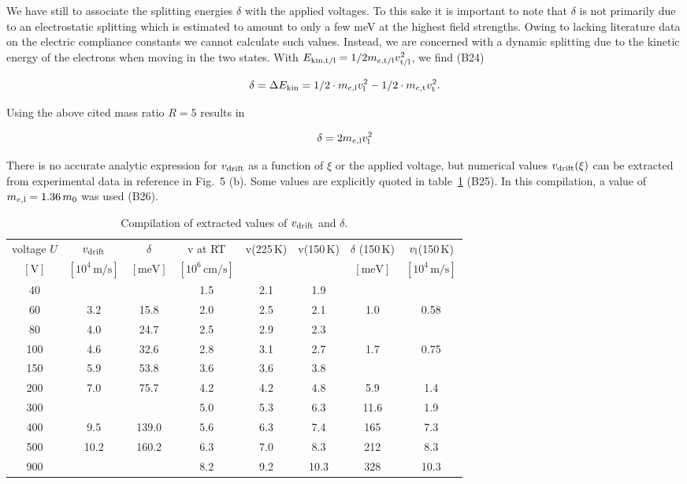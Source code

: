 We have still to associate the splitting energies $\delta$ with the applied voltages. 
To this sake it is important to note that $\delta$ is not primarily due to an electrostatic splitting which is estimated to amount to only a few meV at the highest field strengths. 
Owing to lacking literature data on the electric compliance constants we cannot calculate such values. 
Instead, we are concerned with a dynamic splitting due to the kinetic energy of the electrons when moving in the two states. 
With $E_{\textrm{kin,t/l}} = 1/2 m_{\mathnormal{e},\textrm{t/l}}v_{\textrm{t/l}}^2$, we find {\color{red}(B24)}

\begin{equation}
 \delta = \Delta E_{\textrm{kin}} = 1/2 \cdot m_{\mathnormal{e},\textrm{l}} v_{\textrm{l}}^2 - 1/2 \cdot m_{\mathnormal{e},\textrm{t}} v_{\textrm{t}}^2.
\end{equation}

\noindent
Using the above cited mass ratio $R =5$ results in

\begin{equation}
 \delta = 2 m_{\mathnormal{e},\textrm{l}} v_{\textrm{l}}^2
\end{equation}

\noindent
There is no accurate analytic expression for $v_{\textrm{drift}}$ as a function of $\xi$ or the applied voltage,
 but numerical values $v_{\textrm{drift}}(\xi)$ can be extracted from experimental data in reference \cite{jansen:173706} in Fig.~5 (b). 
Some values are explicitly quoted in table~\ref{tab:deltas} {\color{red}(B25)}.
In this compilation, a value of $m_{\mathnormal{e},\textrm{l}}  = 1.36\,m_0$  was used {\color{red}(B26)}.

\begin{table}[t]
\caption[delta values]{Compilation of extracted values of $v_{\textrm{drift}}$ and $\delta$.}
 \begin{center}
  \begin{tabular}{c|c|c||c|c|c||c|c}
  voltage $U$ & $v_{\textrm{drift}}$ & $\delta$ & v at RT& v(225\,K) & v(150\,K) & $\delta$ (150\,K) & $v_{\textrm{l}}$(150\,K)\\
  $[\si{\volt}]$  & $[10^4\,\si{\m/\s}]$  & $[\si{\meV}]$  &  $[10^6\,\si{\cm/\s}]$ &  & & $[\si{\meV}]$  & $[10^4\,\si{\m/\s}]$\\ \hline
  40  &      &       & 1.5  & 2.1 &  1.9 & &\\
  60  & 3.2  &  15.8 & 2.0  & 2.5 &  2.1 &   1.0 &  0.58\\
  80  & 4.0  &  24.7 & 2.5  & 2.9 &  2.3 & &  \\
  100 & 4.6  &  32.6 & 2.8  & 3.1 &  2.7 &   1.7 &  0.75\\
  150 & 5.9  &  53.8 & 3.6  & 3.6 &  3.8 & &  \\
  200 & 7.0  &  75.7 & 4.2  & 4.2 &  4.8 &   5.9 &  1.4\\
  300 &      &       & 5.0  & 5.3 &  6.3 &  11.6 &  1.9\\
  400 & 9.5  & 139.0 & 5.6  & 6.3 &  7.4 & 165   &  7.3\\
  500 & 10.2 & 160.2 & 6.3  & 7.0 &  8.3 & 212   &  8.3\\
  900 &      &       & 8.2  & 9.2 & 10.3 & 328   & 10.3\\
  \end{tabular}
  \label{tab:deltas}
 \end{center}
\end{table}

